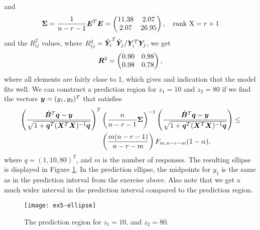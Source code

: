and
\begin{equation*}
  \bm{\Sigma} = \frac{1}{n-r-1} \bm{E} ^{T} \bm{E} = 
  \begin{pmatrix}
    11.38 &2.07 \\ 
    2.07 &26.95  
  \end{pmatrix},\quad \text{rank X} = r+1
\end{equation*}
and the $R^{2}_{ij}$ values, where $R^{2}_{ij} =  \hat{\bm{Y}_{i}}^{T} 
\hat{\bm{Y}}_{j} /  \bm{Y}_{i}^{T} \bm{Y}_{j}$, we get
\begin{equation*}
  \bm{R}^{2} =
  \begin{pmatrix}
    0.90 &0.98 \\ 
    0.98 &0.78
  \end{pmatrix},
\end{equation*}
where all elements are fairly close to 1, which gives and indication
that the model fits well. We can construct a prediction region for
$z_{1} = 10$ and $z_{2} = 80$ if we find the vectors $\bm{y} =
(y_{1}, y_{2})^{T}$ that satisfies
\begin{align*}
  \left(
    \frac{\hat{\bm{B}}^{T} \bm{q} - \bm{y}}{\sqrt{1 + \bm{q}^{T}(\bm{X}^{T} \bm{X})^{-1}\bm{q}}}
  \right)^{T} &
  \left(
    \frac{n}{n-r-1}\bm{\Sigma}
  \right)^{-1}
   \left(
    \frac{\hat{\bm{B}}^{T} \bm{q} - \bm{y}}{\sqrt{1 + \bm{q}^{T}(\bm{X}^{T} \bm{X})^{-1}\bm{q}}}
  \right)
\leq \\
  &
    \left(
    \frac{m(n-r-1)}{n-r-m}
    \right)
    F_{m,n-r-m}(1-\alpha),
\end{align*}
where $q = (1, 10, 80)^{T}$, and $m$ is the number of responses. The
resulting ellipse is displayed in Figure \ref{fig:ex5-ellipse}. In the
prediction ellipse, the midpoints for $y_{1}$
is the same as in the prediction interval from the exercise above. Also
note that we get a much wider interval in the
prediction interval compared to the prediction region. 

\begin{figure}
  \centering
  \texttt{[image: ex5-ellipse]}
  \caption{The prediction region for $z_1 = 10$, and $z_2 = 80$.}
  \label{fig:ex5-ellipse}
\end{figure}

